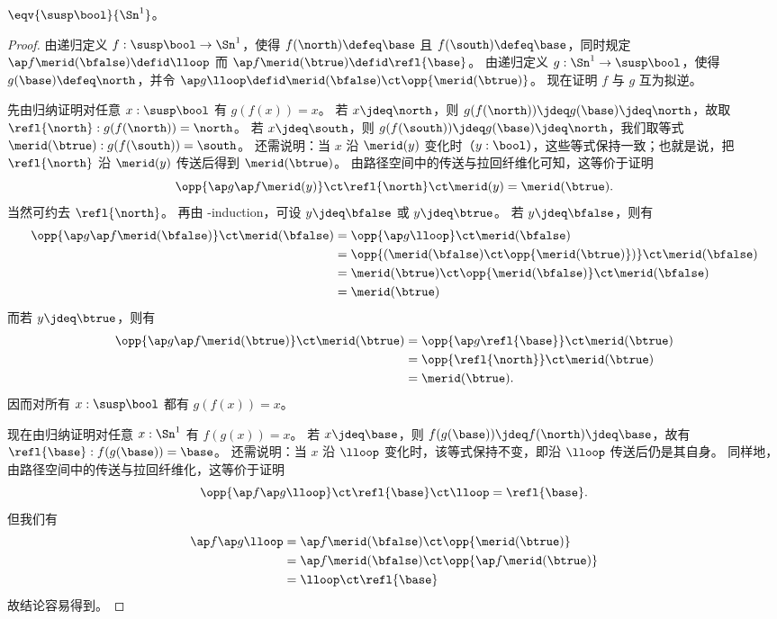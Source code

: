 \begin{lem}\label{thm:suspbool}
  $\eqv{\susp\bool}{\Sn^1}$。
\end{lem}
\begin{proof}
  由递归定义 $f:\susp\bool\to\Sn^1$，使得 $f(\north)\defeq \base$ 且 $f(\south)\defeq\base$，同时规定 $\ap f{\merid(\bfalse)}\defid\lloop$ 而 $\ap f{\merid(\btrue)} \defid \refl{\base}$。
  由递归定义 $g:\Sn^1\to\susp\bool$，使得 $g(\base)\defeq \north$，并令 $\ap g \lloop \defid \merid(\bfalse) \ct \opp{\merid(\btrue)}$。
  现在证明 $f$ 与 $g$ 互为拟逆。

  先由归纳证明对任意 $x:\susp \bool$ 有 $g(f(x))=x$。
  若 $x\jdeq\north$，则 $g(f(\north)) \jdeq g(\base)\jdeq \north$，故取 $\refl{\north} : g(f(\north))=\north$。
  若 $x\jdeq\south$，则 $g(f(\south)) \jdeq g(\base)\jdeq \north$，我们取等式 $\merid(\btrue) : g(f(\south)) = \south$。
  还需说明：当 $x$ 沿 $\merid(y)$ 变化时（$y:\bool$），这些等式保持一致；也就是说，把 $\refl{\north}$ 沿 $\merid(y)$ 传送后得到 $\merid(\btrue)$。
  由路径空间中的传送与拉回纤维化可知，这等价于证明
  \[ \opp{\ap g {\ap f {\merid(y)}}} \ct \refl{\north} \ct \merid(y) = \merid(\btrue). \]
  当然可约去 $\refl{\north}$。
  再由 \bool-induction，可设 $y\jdeq \bfalse$ 或 $y\jdeq \btrue$。
  若 $y\jdeq \bfalse$，则有
  \begin{align*}
    \opp{\ap g {\ap f {\merid(\bfalse)}}} \ct \merid(\bfalse)
    &= \opp{\ap g {\lloop}} \ct \merid(\bfalse)\\
    &= \opp{(\merid(\bfalse) \ct \opp{\merid(\btrue)})} \ct \merid(\bfalse)\\
    &= \merid(\btrue) \ct \opp{\merid(\bfalse)} \ct \merid(\bfalse)\\
    &= \merid(\btrue)
  \end{align*}
  而若 $y\jdeq \btrue$，则有
  \begin{align*}
    \opp{\ap g {\ap f {\merid(\btrue)}}} \ct \merid(\btrue)
    &= \opp{\ap g {\refl{\base}}} \ct \merid(\btrue)\\
    &= \opp{\refl{\north}} \ct \merid(\btrue)\\
    &= \merid(\btrue).
  \end{align*}
  因而对所有 $x:\susp \bool$ 都有 $g(f(x))=x$。

  现在由归纳证明对任意 $x:\Sn^1$ 有 $f(g(x))=x$。
  若 $x\jdeq \base$，则 $f(g(\base))\jdeq f(\north)\jdeq\base$，故有 $\refl{\base} : f(g(\base))=\base$。
  还需说明：当 $x$ 沿 $\lloop$ 变化时，该等式保持不变，即沿 $\lloop$ 传送后仍是其自身。
  同样地，由路径空间中的传送与拉回纤维化，这等价于证明
  \[ \opp{\ap f {\ap g {\lloop}}} \ct \refl{\base} \ct \lloop = \refl{\base}.\]
  但我们有
  \begin{align*}
    \ap f {\ap g {\lloop}} &= \ap f {\merid(\bfalse) \ct \opp{\merid(\btrue)}}\\
    &= \ap f {\merid(\bfalse)} \ct \opp{\ap f {\merid(\btrue)}}\\
    &= \lloop \ct \refl{\base}
  \end{align*}
  故结论容易得到。
\end{proof}

